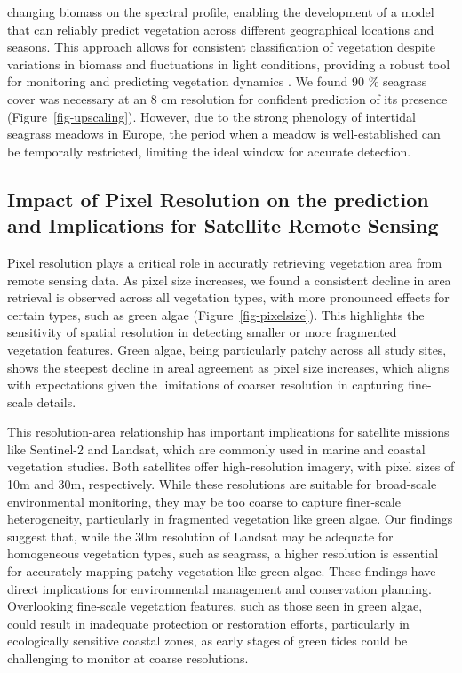\documentclass[
  number]{elsarticle}
\begin{document}
changing biomass on the spectral profile, enabling the development of a
model that can reliably predict vegetation across different geographical
locations and seasons. This approach allows for consistent
classification of vegetation despite variations in biomass and
fluctuations in light conditions, providing a robust tool for monitoring
and predicting vegetation dynamics
\citep{fyfe2003spatial, COSTA2021107018, piaser2023impact}. We found 90
\% seagrass cover was necessary at an 8 cm resolution for confident
prediction of its presence (Figure~\ref{fig-upscaling}). However, due to
the strong phenology of intertidal seagrass meadows in Europe, the
period when a meadow is well-established can be temporally restricted,
limiting the ideal window for accurate detection.

\subsection{Impact of Pixel Resolution on the prediction and
Implications for Satellite Remote
Sensing}\label{impact-of-pixel-resolution-on-the-prediction-and-implications-for-satellite-remote-sensing}

Pixel resolution plays a critical role in accuratly retrieving
vegetation area from remote sensing data. As pixel size increases, we
found a consistent decline in area retrieval is observed across all
vegetation types, with more pronounced effects for certain types, such
as green algae (Figure~\ref{fig-pixelsize}). This highlights the
sensitivity of spatial resolution in detecting smaller or more
fragmented vegetation features. Green algae, being particularly patchy
across all study sites, shows the steepest decline in areal agreement as
pixel size increases, which aligns with expectations given the
limitations of coarser resolution in capturing fine-scale details.

This resolution-area relationship has important implications for
satellite missions like Sentinel-2 and Landsat, which are commonly used
in marine and coastal vegetation studies. Both satellites offer
high-resolution imagery, with pixel sizes of 10m and 30m, respectively.
While these resolutions are suitable for broad-scale environmental
monitoring, they may be too coarse to capture finer-scale heterogeneity,
particularly in fragmented vegetation like green algae. Our findings
suggest that, while the 30m resolution of Landsat may be adequate for
homogeneous vegetation types, such as seagrass, a higher resolution is
essential for accurately mapping patchy vegetation like green algae.
These findings have direct implications for environmental management and
conservation planning. Overlooking fine-scale vegetation features, such
as those seen in green algae, could result in inadequate protection or
restoration efforts, particularly in ecologically sensitive coastal
zones, as early stages of green tides could be challenging to monitor at
coarse resolutions.
\end{document}
